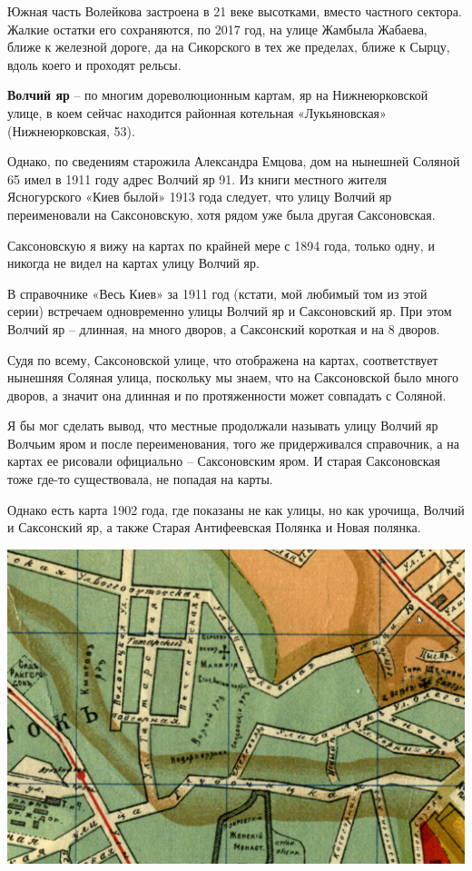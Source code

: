 Южная часть Волейкова застроена в 21 веке высотками, вместо частного сектора. Жалкие остатки его сохраняются, по 2017 год, на улице Жамбыла Жабаева, ближе к железной дороге, да на Сикорского в тех же пределах, ближе к Сырцу, вдоль коего и проходят рельсы.\\

\medskip

\textbf{Волчий яр} – по многим  дореволюционным картам, яр на Нижнеюрковской улице, в коем сейчас находится районная котельная «Лукьяновская» (Нижнеюрковская, 53). 

Однако, по сведениям старожила Александ\-ра Емцова, дом на нынешней Соляной 65 имел в 1911 году адрес Волчий яр 91. Из книги местного жителя Ясногурского «Киев былой» 1913 года следует, что улицу Волчий яр переименовали на Саксоновскую, хотя рядом уже была другая Саксоновская.

Саксоновскую я вижу на картах по крайней мере с 1894 года, только одну, и никогда не видел на картах улицу Волчий яр. 

В справочнике «Весь Киев» за 1911 год (кстати, мой любимый том из этой серии) встречаем одновременно улицы Волчий яр и Саксоновский яр. При этом Волчий яр – длинная, на много дворов, а Саксонский короткая и на 8 дворов.

Судя по всему, Саксоновской улице, что отображена на картах, соответствует нынешняя Соляная улица, поскольку мы знаем, что на Саксоновской было много дворов, а значит она длинная и по протяженности может совпадать с Соляной.

Я бы мог сделать вывод, что местные продолжали называть улицу Волчий яр Волчьим яром и после переименования, того же придерживался справочник, а на картах ее рисовали официально – Саксоновским яром. И старая Саксоновская тоже где-то существовала, не попадая на карты. 

Однако есть карта 1902 года, где показаны не как улицы, но как урочища, Волчий и Саксонский яр, а также Старая Антифеевская Полянка и Новая полянка.

\begin{center}
\includegraphics[width=\linewidth]{rpix/volch01.jpg}
\end{center}


